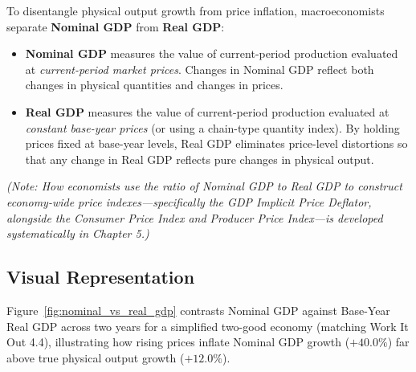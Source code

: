 \documentclass[11pt,letterpaper]{article}
\begin{document}
To disentangle physical output growth from price inflation, macroeconomists separate \textbf{Nominal GDP} from \textbf{Real GDP}:
\begin{itemize}
    \item \textbf{Nominal GDP} measures the value of current-period production evaluated at \emph{current-period market prices}. Changes in Nominal GDP reflect both changes in physical quantities and changes in prices.
    \item \textbf{Real GDP} measures the value of current-period production evaluated at \emph{constant base-year prices} (or using a chain-type quantity index). By holding prices fixed at base-year levels, Real GDP eliminates price-level distortions so that any change in Real GDP reflects pure changes in physical output.
\end{itemize}
\emph{(Note: How economists use the ratio of Nominal GDP to Real GDP to construct economy-wide price indexes—specifically the GDP Implicit Price Deflator, alongside the Consumer Price Index and Producer Price Index—is developed systematically in Chapter 5.)}

\subsection*{Visual Representation}
Figure~\ref{fig:nominal_vs_real_gdp} contrasts Nominal GDP against Base-Year Real GDP across two years for a simplified two-good economy (matching Work It Out 4.4), illustrating how rising prices inflate Nominal GDP growth ($+40.0\%$) far above true physical output growth ($+12.0\%$).
\end{document}
